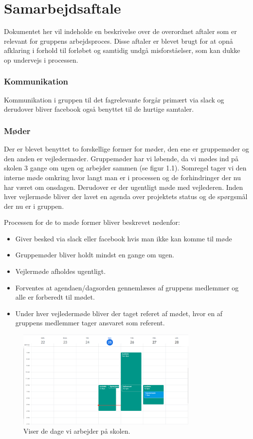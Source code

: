 \chapter{Samarbejdsaftale}
Dokumentet her vil indeholde en beskrivelse over de overordnet aftaler som er relevant for gruppens arbejdsproces. Disse aftaler er blevet brugt for at opnå afklaring i forhold til forløbet og samtidig undgå misforståelser, som kan dukke op undervejs i processen.


\subsection{Kommunikation}
Kommunikation i gruppen til det fagrelevante forgår primært via slack og derudover bliver facebook også benyttet til de hurtige samtaler.

\subsection{Møder}
Der er blevet benyttet to forskellige former for møder, den ene er gruppemøder og den anden er vejledermøder. Gruppemøder har vi løbende, da vi mødes ind på skolen 3 gange om ugen og arbejder sammen (se figur 1.1). Somregel tager vi den interne møde omkring hvor langt man er i processen og de forhindringer der nu har været om onsdagen. Derudover er der ugentligt møde med vejlederen. Inden hver vejlermøde bliver der lavet en agenda over projektets status og de spørgsmål der nu er i gruppen. 

Processen for de to møde former bliver beskrevet nedenfor:
\begin{itemize}
    \item Giver besked via slack eller facebook hvis man ikke kan komme til møde
    \item Gruppemøder bliver holdt mindst en gange om ugen.
    \item Vejlermøde afholdes ugentligt.
    \item Forventes at agendaen/dagsorden gennemlæses af gruppens medlemmer og alle er forberedt til mødet.
    \item Under hver vejledermøde bliver der taget referet af mødet, hvor en af gruppens medlemmer tager ansvaret som referent.
  
\end{itemize}


    \begin{figure}[ht]
        \centering
    \includegraphics[width=0.8\textwidth]{Billeder/groupmeeting.png}
    \caption{Viser de dage vi arbejder på skolen.}
    \label{fig:figure2}
\end{figure}

